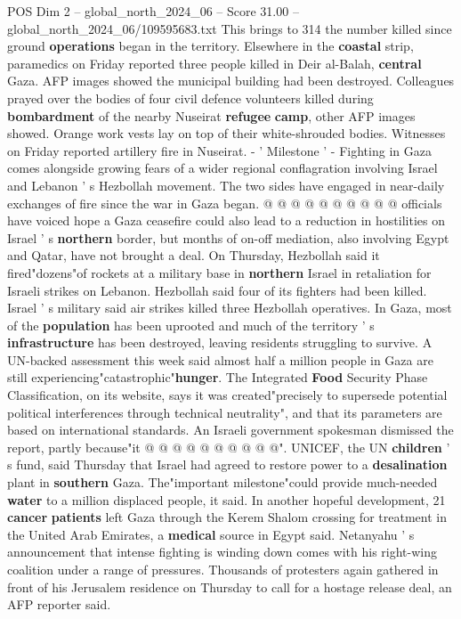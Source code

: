 \begin{textsample}{POS Dim 2 – global\_north\_2024\_06 – Score 31.00 – global\_north\_2024\_06/109595683.txt}
This brings to 314 the number killed since ground \textbf{operations} began in the territory.
Elsewhere in the \textbf{coastal} strip, paramedics on Friday reported three people killed in Deir al-Balah, \textbf{central} Gaza.
AFP images showed the municipal building had been destroyed.
Colleagues prayed over the bodies of four civil defence volunteers killed during \textbf{bombardment} of the nearby Nuseirat \textbf{refugee} \textbf{camp}, other AFP images showed.
Orange work vests lay on top of their white-shrouded bodies.
Witnesses on Friday reported artillery fire in Nuseirat. - ' Milestone ' - Fighting in Gaza comes alongside growing fears of a wider regional conflagration involving Israel and Lebanon ' s Hezbollah movement.
The two sides have engaged in near-daily exchanges of fire since the war in Gaza began. @ @ @ @ @ @ @ @ @ @ officials have voiced hope a Gaza ceasefire could also lead to a reduction in hostilities on Israel ' s \textbf{northern} border, but months of on-off mediation, also involving Egypt and Qatar, have not brought a deal.
On Thursday, Hezbollah said it fired"dozens"of rockets at a military base in \textbf{northern} Israel in retaliation for Israeli strikes on Lebanon.
Hezbollah said four of its fighters had been killed.
Israel ' s military said air strikes killed three Hezbollah operatives.
In Gaza, most of the \textbf{population} has been uprooted and much of the territory ' s \textbf{infrastructure} has been destroyed, leaving residents struggling to survive.
A UN-backed assessment this week said almost half a million people in Gaza are still experiencing"catastrophic"\textbf{hunger}.
The Integrated \textbf{Food} Security Phase Classification, on its website, says it was created"precisely to supersede potential political interferences through technical neutrality", and that its parameters are based on international standards.
An Israeli government spokesman dismissed the report, partly because"it @ @ @ @ @ @ @ @ @ @".
UNICEF, the UN \textbf{children} ' s fund, said Thursday that Israel had agreed to restore power to a \textbf{desalination} plant in \textbf{southern} Gaza.
The"important milestone"could provide much-needed \textbf{water} to a million displaced people, it said.
In another hopeful development, 21 \textbf{cancer} \textbf{patients} left Gaza through the Kerem Shalom crossing for treatment in the United Arab Emirates, a \textbf{medical} source in Egypt said.
Netanyahu ' s announcement that intense fighting is winding down comes with his right-wing coalition under a range of pressures.
Thousands of protesters again gathered in front of his Jerusalem residence on Thursday to call for a hostage release deal, an AFP reporter said.

\end{textsample}
